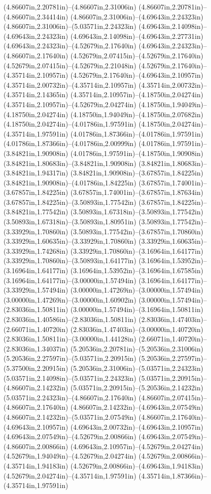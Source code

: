 (4.86607in,2.20781in)--(4.86607in,2.31006in) (4.86607in,2.20781in)--(4.86607in,2.34414in) (4.86607in,2.31006in)--(4.69643in,2.24323in) (4.86607in,2.31006in)--(5.03571in,2.24323in) (4.69643in,2.14098in)--(4.69643in,2.24323in) (4.69643in,2.14098in)--(4.69643in,2.27731in) (4.69643in,2.24323in)--(4.52679in,2.17640in) (4.69643in,2.24323in)--(4.86607in,2.17640in) (4.52679in,2.07415in)--(4.52679in,2.17640in) (4.52679in,2.07415in)--(4.52679in,2.21048in) (4.52679in,2.17640in)--(4.35714in,2.10957in) (4.52679in,2.17640in)--(4.69643in,2.10957in) (4.35714in,2.00732in)--(4.35714in,2.10957in) (4.35714in,2.00732in)--(4.35714in,2.14365in) (4.35714in,2.10957in)--(4.18750in,2.04274in) (4.35714in,2.10957in)--(4.52679in,2.04274in) (4.18750in,1.94049in)--(4.18750in,2.04274in) (4.18750in,1.94049in)--(4.18750in,2.07682in) (4.18750in,2.04274in)--(4.01786in,1.97591in) (4.18750in,2.04274in)--(4.35714in,1.97591in) (4.01786in,1.87366in)--(4.01786in,1.97591in) (4.01786in,1.87366in)--(4.01786in,2.00999in) (4.01786in,1.97591in)--(3.84821in,1.90908in) (4.01786in,1.97591in)--(4.18750in,1.90908in) (3.84821in,1.80683in)--(3.84821in,1.90908in) (3.84821in,1.80683in)--(3.84821in,1.94317in) (3.84821in,1.90908in)--(3.67857in,1.84225in) (3.84821in,1.90908in)--(4.01786in,1.84225in) (3.67857in,1.74001in)--(3.67857in,1.84225in) (3.67857in,1.74001in)--(3.67857in,1.87634in) (3.67857in,1.84225in)--(3.50893in,1.77542in) (3.67857in,1.84225in)--(3.84821in,1.77542in) (3.50893in,1.67318in)--(3.50893in,1.77542in) (3.50893in,1.67318in)--(3.50893in,1.80951in) (3.50893in,1.77542in)--(3.33929in,1.70860in) (3.50893in,1.77542in)--(3.67857in,1.70860in) (3.33929in,1.60635in)--(3.33929in,1.70860in) (3.33929in,1.60635in)--(3.33929in,1.74268in) (3.33929in,1.70860in)--(3.16964in,1.64177in) (3.33929in,1.70860in)--(3.50893in,1.64177in) (3.16964in,1.53952in)--(3.16964in,1.64177in) (3.16964in,1.53952in)--(3.16964in,1.67585in) (3.16964in,1.64177in)--(3.00000in,1.57494in) (3.16964in,1.64177in)--(3.33929in,1.57494in) (3.00000in,1.47269in)--(3.00000in,1.57494in) (3.00000in,1.47269in)--(3.00000in,1.60902in) (3.00000in,1.57494in)--(2.83036in,1.50811in) (3.00000in,1.57494in)--(3.16964in,1.50811in) (2.83036in,1.40586in)--(2.83036in,1.50811in) (2.83036in,1.47403in)--(2.66071in,1.40720in) (2.83036in,1.47403in)--(3.00000in,1.40720in) (2.83036in,1.50811in)--(3.00000in,1.44128in) (2.66071in,1.40720in)--(2.83036in,1.34037in) (5.20536in,2.20781in)--(5.20536in,2.31006in) (5.20536in,2.27597in)--(5.03571in,2.20915in) (5.20536in,2.27597in)--(5.37500in,2.20915in) (5.20536in,2.31006in)--(5.03571in,2.24323in) (5.03571in,2.14098in)--(5.03571in,2.24323in) (5.03571in,2.20915in)--(4.86607in,2.14232in) (5.03571in,2.20915in)--(5.20536in,2.14232in) (5.03571in,2.24323in)--(4.86607in,2.17640in) (4.86607in,2.07415in)--(4.86607in,2.17640in) (4.86607in,2.14232in)--(4.69643in,2.07549in) (4.86607in,2.14232in)--(5.03571in,2.07549in) (4.86607in,2.17640in)--(4.69643in,2.10957in) (4.69643in,2.00732in)--(4.69643in,2.10957in) (4.69643in,2.07549in)--(4.52679in,2.00866in) (4.69643in,2.07549in)--(4.86607in,2.00866in) (4.69643in,2.10957in)--(4.52679in,2.04274in) (4.52679in,1.94049in)--(4.52679in,2.04274in) (4.52679in,2.00866in)--(4.35714in,1.94183in) (4.52679in,2.00866in)--(4.69643in,1.94183in) (4.52679in,2.04274in)--(4.35714in,1.97591in) (4.35714in,1.87366in)--(4.35714in,1.97591in) 